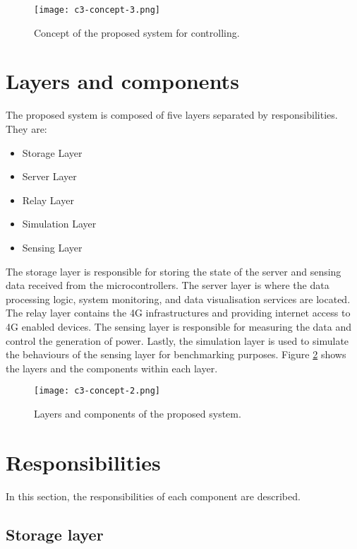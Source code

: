 \documentclass[../thesis.tex]{subfiles}
\begin{document}
\begin{figure}[!ht]
\texttt{[image: c3-concept-3.png]}
\caption{Concept of the proposed system for controlling.}
\label{fig:concept3}
\end{figure}


\newpage
\section{Layers and components}
\label{sec:layers}

The proposed system is composed of five layers separated by responsibilities. They are:

\begin{itemize}
\item Storage Layer
\item Server Layer
\item Relay Layer
\item Simulation Layer
\item Sensing Layer
\end{itemize}

The storage layer is responsible for storing the state of the server and sensing data received from the microcontrollers. The server layer is where the data processing logic, system monitoring, and data visualisation services are located. The relay layer contains the 4G infrastructures and providing internet access to 4G enabled devices. The sensing layer is responsible for measuring the data and control the generation of power. Lastly, the simulation layer is used to simulate the behaviours of the sensing layer for benchmarking purposes. Figure \ref{fig:concept2} shows the layers and the components within each layer.


\begin{figure}[!ht]
\texttt{[image: c3-concept-2.png]}
\caption{Layers and components of the proposed system.}
\label{fig:concept2}
\end{figure}

\section{Responsibilities}
\label{sec:responsibilities}

In this section, the responsibilities of each component are described.

\subsection{Storage layer}
\end{document}
